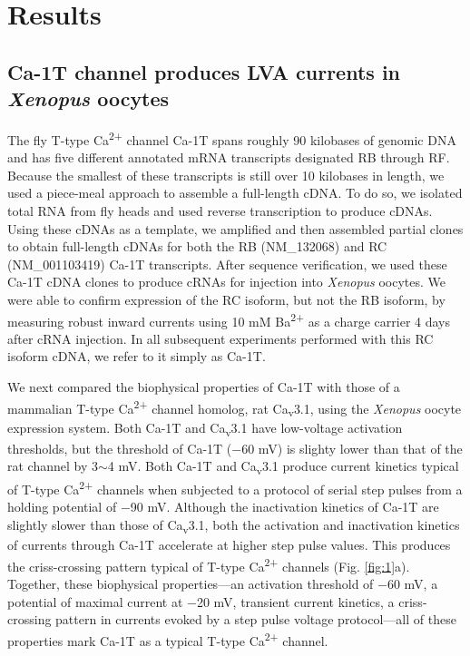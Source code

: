 \section*{Results}

\subsection*{Ca-\alpha1T channel produces LVA currents in \emph{Xenopus} oocytes}

The fly T-type Ca\textsuperscript{2+} channel Ca-\alpha1T spans roughly 90 kilobases of genomic DNA and has five different annotated mRNA transcripts designated RB through RF.
Because the smallest of these transcripts is still over 10 kilobases in length, we used a piece-meal approach to assemble a full-length cDNA.
To do so, we isolated total RNA from fly heads and used reverse transcription to produce cDNAs.
Using these cDNAs as a template, we amplified and then assembled partial clones to obtain full-length cDNAs for both the RB (NM_132068) and RC (NM_001103419) Ca-\alpha1T transcripts.
After sequence verification, we used these Ca-\alpha1T cDNA clones to produce cRNAs for injection into \emph{Xenopus} oocytes.
We were able to confirm expression of the RC isoform, but not the RB isoform, by measuring robust inward currents using 10 mM Ba\textsuperscript{2+} as a charge carrier 4 days after cRNA injection. 
In all subsequent experiments performed with this RC isoform cDNA, we refer to it simply as Ca-\alpha1T.

We next compared the biophysical properties of Ca-\alpha1T with those of a mammalian T-type Ca\textsuperscript{2+} channel homolog, rat Ca\textsubscript{v}3.1\cite{PerezReyes:1998gn}, using the \emph{Xenopus} oocyte expression system.
Both Ca-\alpha1T and Ca\textsubscript{v}3.1 have low-voltage activation thresholds, but the threshold of Ca-\alpha1T ($-$60 mV) is slighty lower than that of the rat channel by 3$\sim$4 mV.
Both Ca-\alpha1T and Ca\textsubscript{v}3.1 produce current kinetics typical of T-type Ca\textsuperscript{2+} channels when subjected to a protocol of serial step pulses from a holding potential of $-$90 mV.
Although the inactivation kinetics of Ca-\alpha1T are slightly slower than those of Ca\textsubscript{v}3.1, both the activation and inactivation kinetics of currents through Ca-\alpha1T accelerate at higher step pulse values. This produces the criss-crossing pattern typical of T-type Ca\textsuperscript{2+} channels (Fig. \ref{fig:1}a).
Together, these biophysical properties---an activation threshold of $-$60 mV, a potential of maximal current at $-$20 mV, transient current kinetics, a criss-crossing pattern in currents evoked by a step pulse voltage protocol---all of these properties mark Ca-\alpha1T as a typical T-type Ca\textsuperscript{2+} channel\cite{PerezReyes:1998gn,carbone:1984aa,Cribbs:1998vc,lee:1999aa}.

